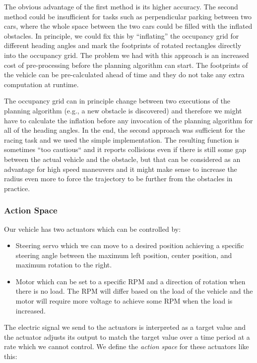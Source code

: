 The obvious advantage of the first method is its higher accuracy. The second method could be insufficient for tasks such as perpendicular parking between two cars, where the whole space between the two cars could be filled with the inflated obstacles. In principle, we could fix this by ``inflating'' the occupancy grid for different heading angles and mark the footprints of rotated rectangles directly into the occupancy grid. The problem we had with this approach is an increased cost of pre-processing before the planning algorithm can start. The footprints of the vehicle can be pre-calculated ahead of time and they do not take any extra computation at runtime.

The occupancy grid can in principle change between two executions of the planning algorithm (e.g., a new obstacle is discovered) and therefore we might have to calculate the inflation before any invocation of the planning algorithm for all of the heading angles. In the end, the second approach was sufficient for the racing task and we used the simple implementation. The resulting function is sometimes ``too cautious`` and it reports collisions even if there is still some gap between the actual vehicle and the obstacle, but that can be considered as an advantage for high speed maneuvers and it might make sense to increase the radius even more to force the trajectory to be further from the obstacles in practice.

\subsubsection{Action Space}

Our vehicle has two actuators which can be controlled by:
\begin{itemize}
	\item Steering servo which we can move to a desired position achieving a specific steering angle between the maximum left position, center position, and maximum rotation to the right.
	
	\item Motor which can be set to a specific \gls{RPM} and a direction of rotation when there is no load. The \gls*{RPM} will differ based on the load of the vehicle and the motor will require more voltage to achieve some RPM when the load is increased.
\end{itemize}

The electric signal we send to the actuators is interpreted as a target value and the actuator adjusts its output to match the target value over a time period at a rate which we cannot control. We define the \textit{action space} for these actuators like this:

